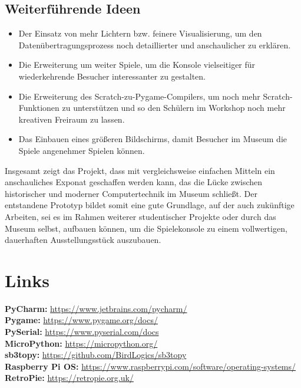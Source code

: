 \subsection{Weiterführende Ideen}
\begin{itemize}
	\item Der Einsatz von mehr Lichtern bzw. feinere Visualisierung, um den Datenübertragungsprozess noch detaillierter und anschaulicher zu erklären.
	\item Die Erweiterung um weiter Spiele, um die Konsole vielseitiger für wiederkehrende Besucher interessanter zu gestalten.
	\item Die Erweiterung des Scratch-zu-Pygame-Compilers, um noch mehr Scratch-Funktionen zu unterstützen und so den Schülern im Workshop noch mehr kreativen Freiraum zu lassen.
	\item Das Einbauen eines größeren Bildschirms, damit Besucher im Museum die Spiele angenehmer Spielen können.
\end{itemize}
Insgesamt zeigt das Projekt, dass mit vergleichsweise einfachen Mitteln ein anschauliches Exponat geschaffen werden kann, das die Lücke zwischen historischer und moderner Computertechnik im Museum schließt. Der entstandene Prototyp bildet somit eine gute Grundlage, auf der auch zukünftige Arbeiten, sei es im Rahmen weiterer studentischer Projekte oder durch das Museum selbst, aufbauen können, um die Spielekonsole zu einem vollwertigen, dauerhaften Ausstellungsstück auszubauen.
\clearpage

\section{Links}
\textbf{PyCharm: }\url{https://www.jetbrains.com/pycharm/} \\
\textbf{Pygame: }\url{https://www.pygame.org/docs/} \\
\textbf{PySerial: }\url{https://www.pyserial.com/docs} \\
\textbf{MicroPython: }\url{https://micropython.org/} \\
\textbf{sb3topy: }\url{https://github.com/BirdLogics/sb3topy} \\
\textbf{Raspberry Pi OS: }\url{https://www.raspberrypi.com/software/operating-systems/} \\
\textbf{RetroPie: }\url{https://retropie.org.uk/}
